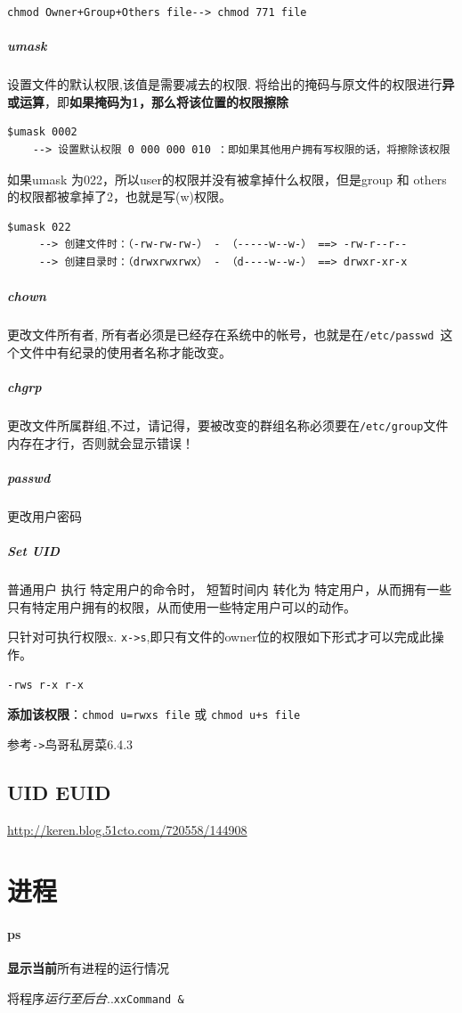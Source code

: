 \documentclass[UTF8,a4paper,12pt]{ctexbook}
\begin{document}
			\verb|chmod Owner+Group+Others file--> chmod 771 file|	 
		 \subparagraph{umask}设置文件的默认权限,该值是需要减去的权限. 将给出的掩码与原文件的权限进行\textbf{异或运算}，即\textbf{如果掩码为1，那么将该位置的权限擦除}
			 \begin{lstlisting}[frame=L,xleftmargin=.1\textwidth]
	$umask 0002
	--> 设置默认权限 0 000 000 010 ：即如果其他用户拥有写权限的话，将擦除该权限
			 \end{lstlisting}
			 
			 如果umask 为022，所以user的权限并没有被拿掉什么权限，但是group 和 others 的权限都被拿掉了2，也就是写(w)权限。
			 \begin{lstlisting}[frame=L,xleftmargin=.1\textwidth]
	$umask 022
	 --> 创建文件时：（-rw-rw-rw-） - （-----w--w-） ==> -rw-r--r--
	 --> 创建目录时：（drwxrwxrwx） - （d----w--w-） ==> drwxr-xr-x
			 \end{lstlisting}
		 \subparagraph{chown}更改文件所有者, 所有者必须是已经存在系统中的帐号，也就是在\verb|/etc/passwd |这个文件中有纪录的使用者名称才能改变。
		 \subparagraph{chgrp}更改文件所属群组,不过，请记得，要被改变的群组名称必须要在\verb|/etc/group|文件内存在才行，否则就会显示错误！
		 \subparagraph{passwd}更改用户密码
		 
		 \subparagraph{Set UID}
			 普通用户 执行 特定用户的命令时， 短暂时间内 转化为 特定用户，从而拥有一些只有特定用户拥有的权限，从而使用一些特定用户可以的动作。
			 
			 只针对可执行权限x. \verb|x->s|,即只有文件的owner位的权限如下形式才可以完成此操作。
			 
			 \verb|-rws r-x r-x|
			 
			 \textbf{添加该权限}：\verb|chmod u=rwxs file| 或 \verb|chmod u+s file|
			 
			 参考\verb|->|鸟哥私房菜6.4.3
			 
		 \subsection{UID EUID}
			 \url{http://keren.blog.51cto.com/720558/144908}
	\section{进程}
		\paragraph{ps}\textbf{显示当前}所有进程的运行情况
			
			将程序\textit{运行至后台}..\verb|xxCommand &|
			
\end{document}
